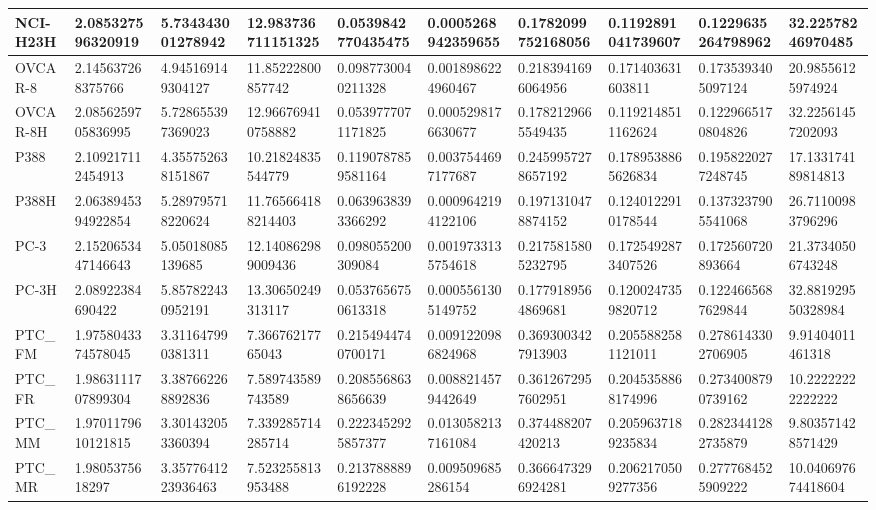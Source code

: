 \documentclass{article}
\begin{document}
\begin{table}[!ht]
\begin{tabular}{|l|l|l|l|l|l|l|l|l|l|}
        NCI-H23H & 2.085327596320919 & 5.734343001278942 & 12.983736711151325 & 0.0539842770435475 & 0.0005268942359655 & 0.1782099752168056 & 0.1192891041739607 & 0.1229635264798962 & 32.22578246970485 \\ \hline
        OVCAR-8 & 2.145637268375766 & 4.945169149304127 & 11.85222800857742 & 0.0987730040211328 & 0.0018986224960467 & 0.2183941696064956 & 0.171403631603811 & 0.1735393405097124 & 20.98556125974924 \\ \hline
        OVCAR-8H & 2.0856259705836995 & 5.728655397369023 & 12.966769410758882 & 0.0539777071171825 & 0.0005298176630677 & 0.1782129665549435 & 0.1192148511162624 & 0.1229665170804826 & 32.22561457202093 \\ \hline
        P388 & 2.109217112454913 & 4.355752638151867 & 10.21824835544779 & 0.1190787859581164 & 0.0037544697177687 & 0.2459957278657192 & 0.1789538865626834 & 0.1958220277248745 & 17.133174189814813 \\ \hline
        P388H & 2.0638945394922854 & 5.289795718220624 & 11.765664188214403 & 0.0639638393366292 & 0.0009642194122106 & 0.1971310478874152 & 0.1240122910178544 & 0.1373237905541068 & 26.71100983796296 \\ \hline
        PC-3 & 2.1520653447146643 & 5.05018085139685 & 12.140862989009436 & 0.098055200309084 & 0.0019733135754618 & 0.2175815805232795 & 0.1725492873407526 & 0.172560720893664 & 21.37340506743248 \\ \hline
        PC-3H & 2.08922384690422 & 5.857822430952191 & 13.30650249313117 & 0.0537656750613318 & 0.0005561305149752 & 0.1779189564869681 & 0.1200247359820712 & 0.1224665687629844 & 32.881929550328984 \\ \hline
        PTC\_FM & 1.9758043374578045 & 3.311647990381311 & 7.36676217765043 & 0.2154944740700171 & 0.0091220986824968 & 0.3693003427913903 & 0.2055882581121011 & 0.2786143302706905 & 9.91404011461318 \\ \hline
        PTC\_FR & 1.9863111707899304 & 3.387662268892836 & 7.589743589743589 & 0.2085568638656639 & 0.0088214579442649 & 0.3612672957602951 & 0.2045358868174996 & 0.2734008790739162 & 10.22222222222222 \\ \hline
        PTC\_MM & 1.9701179610121815 & 3.301432053360394 & 7.339285714285714 & 0.2223452925857377 & 0.0130582137161084 & 0.374488207420213 & 0.2059637189235834 & 0.2823441282735879 & 9.803571428571429 \\ \hline
        PTC\_MR & 1.9805375618297 & 3.3577641223936463 & 7.523255813953488 & 0.2137888896192228 & 0.009509685286154 & 0.3666473296924281 & 0.2062170509277356 & 0.2777684525909222 & 10.040697674418604 \\ \hline

\end{tabular}
\end{table}
\end{document}
